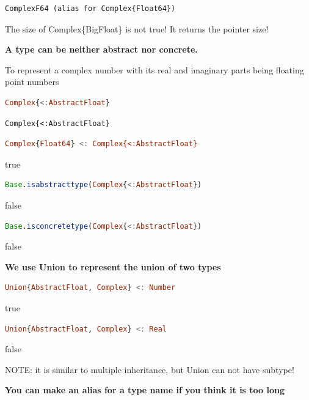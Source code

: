 \documentclass[
  notoc %
]{tufte-book}
\begin{document}
\begin{lstlisting}[language=Output]
ComplexF64 (alias for Complex{Float64})
\end{lstlisting}

The size of Complex\{BigFloat\} is not true! It returns the pointer
size!

\textbf{A type can be neither abstract nor concrete.}

To represent a complex number with its real and imaginary parts being
floating point numbers

\begin{lstlisting}[language=Julia]
Complex{<:AbstractFloat}
\end{lstlisting}

\begin{lstlisting}[language=Output]
Complex{<:AbstractFloat}
\end{lstlisting}

\begin{lstlisting}[language=Julia]
Complex{Float64} <: Complex{<:AbstractFloat}
\end{lstlisting}

true

\begin{lstlisting}[language=Julia]
Base.isabstracttype(Complex{<:AbstractFloat})
\end{lstlisting}

false

\begin{lstlisting}[language=Julia]
Base.isconcretetype(Complex{<:AbstractFloat})
\end{lstlisting}

false

\textbf{We use Union to represent the union of two types}

\begin{lstlisting}[language=Julia]
Union{AbstractFloat, Complex} <: Number
\end{lstlisting}

true

\begin{lstlisting}[language=Julia]
Union{AbstractFloat, Complex} <: Real
\end{lstlisting}

false

NOTE: it is similar to multiple inheritance, but Union can not have
subtype!

\textbf{You can make an alias for a type name if you think it is too
long}
\end{document}
